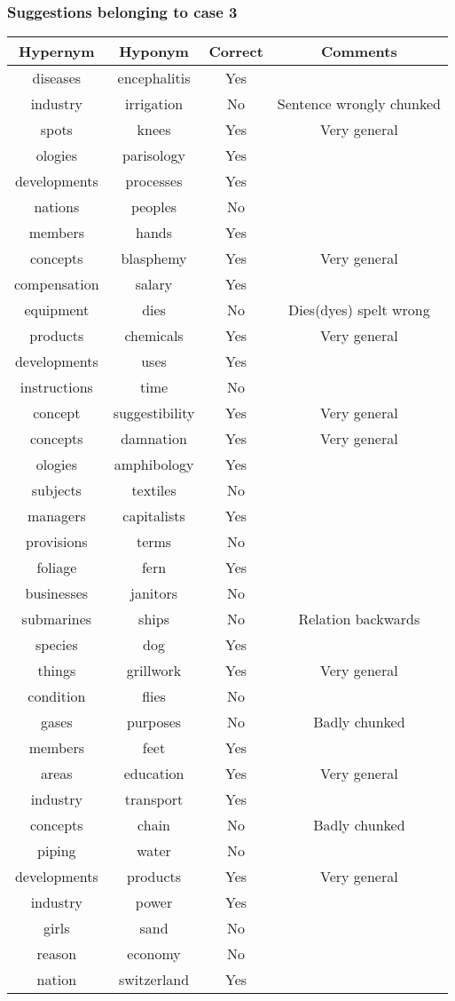 \documentclass[11pt]{article}
\begin{document}
\subsubsection{Suggestions belonging to case 3}
\begin{tabular}{c c c c}
Hypernym & Hyponym & Correct & Comments \\ \hline
diseases & encephalitis & Yes \\
industry & irrigation & No & Sentence wrongly chunked\\
spots & knees & Yes & Very general\\
ologies & parisology & Yes\\
developments & processes & Yes \\
nations & peoples & No\\
members & hands & Yes  \\
concepts & blasphemy & Yes & Very general\\
compensation & salary & Yes \\
equipment & dies & No & Dies(dyes) spelt wrong\\
products & chemicals & Yes & Very general\\
developments & uses & Yes \\
instructions & time & No \\
concept & suggestibility &  Yes & Very general\\
concepts & damnation & Yes & Very general\\
ologies & amphibology & Yes \\
subjects & textiles & No \\
managers & capitalists & Yes\\
provisions & terms & No\\
foliage & fern & Yes\\
businesses & janitors & No \\
submarines & ships & No & Relation backwards\\
species & dog & Yes\\
things & grillwork & Yes & Very general\\
condition & flies & No\\
gases & purposes & No & Badly chunked\\
members & feet & Yes\\
areas & education & Yes & Very general\\
industry & transport & Yes \\
concepts & chain & No & Badly chunked\\
piping & water & No\\
developments & products & Yes & Very general\\
industry & power & Yes\\
girls & sand & No\\
reason & economy & No\\
nation & switzerland & Yes\\
\end{tabular}\\
\end{document}
